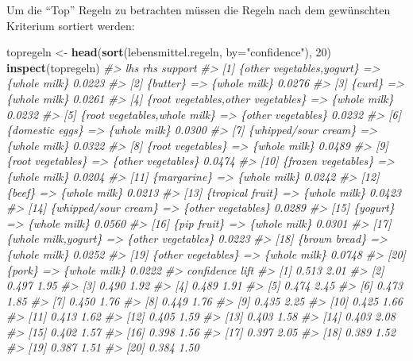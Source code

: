 \documentclass[12pt,]{book}
\newenvironment{Shaded}{\begin{snugshade}}{\end{snugshade}}
\newcommand{\KeywordTok}[1]{\textcolor[rgb]{0.13,0.29,0.53}{\textbf{{#1}}}}
\newcommand{\DataTypeTok}[1]{\textcolor[rgb]{0.13,0.29,0.53}{{#1}}}
\newcommand{\DecValTok}[1]{\textcolor[rgb]{0.00,0.00,0.81}{{#1}}}
\newcommand{\StringTok}[1]{\textcolor[rgb]{0.31,0.60,0.02}{{#1}}}
\newcommand{\CommentTok}[1]{\textcolor[rgb]{0.56,0.35,0.01}{\textit{{#1}}}}
\newcommand{\NormalTok}[1]{{#1}}
\begin{document}
Um die ``Top'' Regeln zu betrachten müssen die Regeln nach dem
gewünschten Kriterium sortiert werden:

\begin{Shaded}
\begin{Highlighting}[]
\NormalTok{topregeln <-}\StringTok{ }\KeywordTok{head}\NormalTok{(}\KeywordTok{sort}\NormalTok{(lebensmittel.regeln, }\DataTypeTok{by=}\StringTok{"confidence"}\NormalTok{), }\DecValTok{20}\NormalTok{)}
\KeywordTok{inspect}\NormalTok{(topregeln)}
\CommentTok{#>      lhs                                   rhs                support}
\CommentTok{#> [1]  \{other vegetables,yogurt\}          => \{whole milk\}       0.0223 }
\CommentTok{#> [2]  \{butter\}                           => \{whole milk\}       0.0276 }
\CommentTok{#> [3]  \{curd\}                             => \{whole milk\}       0.0261 }
\CommentTok{#> [4]  \{root vegetables,other vegetables\} => \{whole milk\}       0.0232 }
\CommentTok{#> [5]  \{root vegetables,whole milk\}       => \{other vegetables\} 0.0232 }
\CommentTok{#> [6]  \{domestic eggs\}                    => \{whole milk\}       0.0300 }
\CommentTok{#> [7]  \{whipped/sour cream\}               => \{whole milk\}       0.0322 }
\CommentTok{#> [8]  \{root vegetables\}                  => \{whole milk\}       0.0489 }
\CommentTok{#> [9]  \{root vegetables\}                  => \{other vegetables\} 0.0474 }
\CommentTok{#> [10] \{frozen vegetables\}                => \{whole milk\}       0.0204 }
\CommentTok{#> [11] \{margarine\}                        => \{whole milk\}       0.0242 }
\CommentTok{#> [12] \{beef\}                             => \{whole milk\}       0.0213 }
\CommentTok{#> [13] \{tropical fruit\}                   => \{whole milk\}       0.0423 }
\CommentTok{#> [14] \{whipped/sour cream\}               => \{other vegetables\} 0.0289 }
\CommentTok{#> [15] \{yogurt\}                           => \{whole milk\}       0.0560 }
\CommentTok{#> [16] \{pip fruit\}                        => \{whole milk\}       0.0301 }
\CommentTok{#> [17] \{whole milk,yogurt\}                => \{other vegetables\} 0.0223 }
\CommentTok{#> [18] \{brown bread\}                      => \{whole milk\}       0.0252 }
\CommentTok{#> [19] \{other vegetables\}                 => \{whole milk\}       0.0748 }
\CommentTok{#> [20] \{pork\}                             => \{whole milk\}       0.0222 }
\CommentTok{#>      confidence lift}
\CommentTok{#> [1]  0.513      2.01}
\CommentTok{#> [2]  0.497      1.95}
\CommentTok{#> [3]  0.490      1.92}
\CommentTok{#> [4]  0.489      1.91}
\CommentTok{#> [5]  0.474      2.45}
\CommentTok{#> [6]  0.473      1.85}
\CommentTok{#> [7]  0.450      1.76}
\CommentTok{#> [8]  0.449      1.76}
\CommentTok{#> [9]  0.435      2.25}
\CommentTok{#> [10] 0.425      1.66}
\CommentTok{#> [11] 0.413      1.62}
\CommentTok{#> [12] 0.405      1.59}
\CommentTok{#> [13] 0.403      1.58}
\CommentTok{#> [14] 0.403      2.08}
\CommentTok{#> [15] 0.402      1.57}
\CommentTok{#> [16] 0.398      1.56}
\CommentTok{#> [17] 0.397      2.05}
\CommentTok{#> [18] 0.389      1.52}
\CommentTok{#> [19] 0.387      1.51}
\CommentTok{#> [20] 0.384      1.50}
\end{Highlighting}
\end{Shaded}
\end{document}
